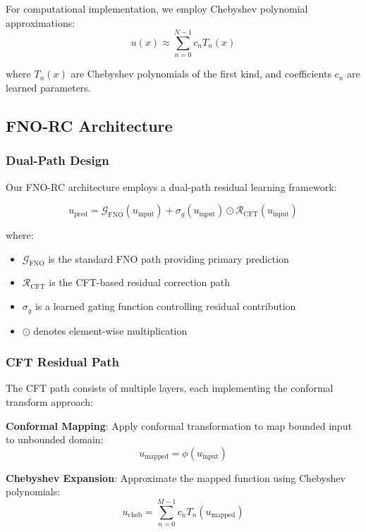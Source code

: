 \documentclass[11pt]{article}
\begin{document}
For computational implementation, we employ Chebyshev polynomial approximations:
\begin{equation}
u(x) \approx \sum_{n=0}^{N-1} c_n T_n(x)
\end{equation}

where $T_n(x)$ are Chebyshev polynomials of the first kind, and coefficients $c_n$ are learned parameters.

\subsection{FNO-RC Architecture}

\subsubsection{Dual-Path Design}

Our FNO-RC architecture employs a dual-path residual learning framework:

\begin{equation}
u_{\text{pred}} = \mathcal{G}_{\text{FNO}}(u_{\text{input}}) + \sigma_g(u_{\text{input}}) \odot \mathcal{R}_{\text{CFT}}(u_{\text{input}})
\end{equation}

where:
\begin{itemize}
\item $\mathcal{G}_{\text{FNO}}$ is the standard FNO path providing primary prediction
\item $\mathcal{R}_{\text{CFT}}$ is the CFT-based residual correction path
\item $\sigma_g$ is a learned gating function controlling residual contribution
\item $\odot$ denotes element-wise multiplication
\end{itemize}

\subsubsection{CFT Residual Path}

The CFT path consists of multiple layers, each implementing the conformal transform approach:

\textbf{Conformal Mapping}: Apply conformal transformation to map bounded input to unbounded domain:
\begin{equation}
u_{\text{mapped}} = \phi(u_{\text{input}})
\end{equation}

\textbf{Chebyshev Expansion}: Approximate the mapped function using Chebyshev polynomials:
\begin{equation}
u_{\text{cheb}} = \sum_{n=0}^{M-1} c_n T_n(u_{\text{mapped}})
\end{equation}
\end{document}
